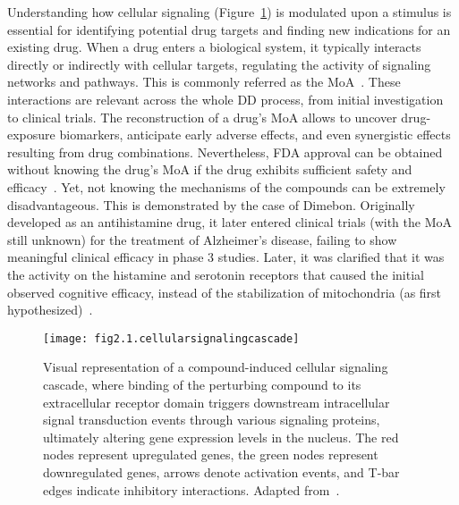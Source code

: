 Understanding how cellular signaling (Figure~\ref{fig:fig2.1.cellularsignalingcascade}) is modulated upon a stimulus is essential for identifying potential drug targets and finding new indications for an existing drug. 
When a drug enters a biological system, it typically interacts directly or indirectly with cellular targets, regulating the activity of signaling networks and pathways. 
This is commonly referred as the \gls{MoA}~\cite{RN52, RN53}. These interactions are relevant across the whole \gls{DD} process, from initial investigation to clinical trials.
The reconstruction of a drug's \gls{MoA} allows to uncover drug-exposure biomarkers, anticipate early adverse effects, and even synergistic effects resulting from drug combinations. 
Nevertheless, FDA approval can be obtained without knowing the drug's \gls{MoA} if the drug exhibits sufficient safety and efficacy~\cite{RN38, RN68}. 
Yet, not knowing the mechanisms of the compounds can be extremely disadvantageous. This is demonstrated by the case of Dimebon. 
Originally developed as an antihistamine drug, it later entered clinical trials (with the \gls{MoA} still unknown) for the treatment of Alzheimer's disease, failing to show meaningful clinical efficacy in phase 3 studies. 
Later, it was clarified that it was the activity on the histamine and serotonin receptors that caused the initial observed cognitive efficacy, instead of the stabilization of mitochondria (as first hypothesized)~\cite{RN38, RN69}.

\begin{figure}[htbp]
    \centering
    \texttt{[image: fig2.1.cellularsignalingcascade]}
    \caption[Visual representation of a compound-induced cellular signaling cascade.]{Visual representation of a compound-induced cellular signaling cascade, where binding of the perturbing compound to its extracellular receptor domain triggers downstream intracellular signal transduction events through various signaling proteins, ultimately altering gene expression levels in the nucleus. The red nodes represent upregulated genes, the green nodes represent downregulated genes, arrows denote activation events, and T-bar edges indicate inhibitory interactions. Adapted from~\cite{RN38}.}
    \label{fig:fig2.1.cellularsignalingcascade}
\end{figure}

